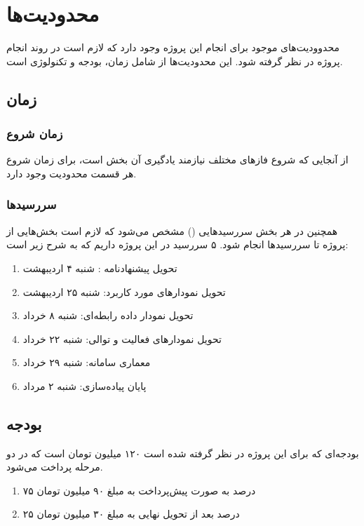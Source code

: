 \chapter{محدودیت‌ها}
محدوودیت‌های موجود برای انجام این پروژه وجود دارد که لازم است در روند انجام پروژه در نظر گرفته شود. این محدودیت‌ها از شامل زمان، بودجه و تکنولوژی است.
\section{زمان}
\subsection{زمان شروع}
از آنجایی که شروع فاز‌های مختلف نیاز‌مند یادگیری آن بخش است، برای زمان شروع هر قسمت محدودیت وجود دارد.
\subsection{سررسیدها}
همچنین در هر بخش سررسید‌هایی
()
مشخص می‌شود که لازم است بخش‌هایی از پروژه تا سررسید‌ها انجام شود. 
۵ سررسید در این پروژه داریم که به شرح زیر است:
\begin{enumerate}
	\item 
	تحویل پیشنهادنامه : شنبه ۴ اردیبهشت
	\item 
	تحویل نمودارهای مورد کاربرد: شنبه ۲۵ اردیبهشت
	\item 
	تحویل نمودار داده رابطه‌ای: شنبه ۸ خرداد
	\item
	تحویل نمودارهای فعالیت و توالی: شنبه ۲۲ خرداد
	\item
	معماری سامانه: شنبه ۲۹ خرداد
	\item
	پایان پیاده‌سازی: شنبه  ۲ مرداد
\end{enumerate}

\section{بودجه}
بودجه‌ای که برای این پروژه در نظر گرفته شده است ۱۲۰ میلیون تومان است که در دو مرحله پرداخت می‌شود.
\begin{enumerate}
	\item 
	۷۵ درصد به صورت پیش‌پرداخت به مبلغ ۹۰ میلیون تومان
	\item 
	۲۵ درصد بعد از تحویل نهایی به مبلغ ۳۰ میلیون تومان
\end{enumerate}

